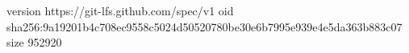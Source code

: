 version https://git-lfs.github.com/spec/v1
oid sha256:9a19201b4c708ec9558c5024d50520780be30e6b7995e939e4e5da363b883c07
size 952920
